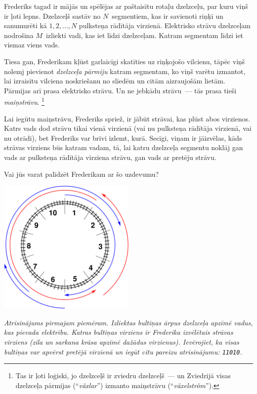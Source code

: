 \ifx\boi\undefined\fi
\def\version{jury-1}
Frederiks tagad ir mājās un spēlējas ar paštaisītu rotaļu dzelzceļu, par kuru viņš ir ļoti lepns.
Dzelzceļš sastāv no $N$~segmentiem, kas ir savienoti riņķī un sanumurēti kā $1, 2, \dots, N$ pulksteņa rādītāja virzienā.
Elektrisko strāvu dzelzceļam nodrošina $M$~izliekti vadi, kas iet līdzi dzelzceļam.
Katram segmentam līdzi iet vismaz viens vads.

Tiesa gan, Frederikam kļūst garlaicīgi skatīties uz riņķojošo vilcienu, tāpēc viņš nolemj pievienot \emph{dzelzceļa pārmiju}
katram segmentam, ko viņš varētu izmantot, lai izraisītu vilciena noskriešanu no sliedēm un citām aizraujošām lietām.
Pārmijas arī prasa elektrisko strāvu. Un ne jebkādu strāvu~--- tās prasa tieši \emph{maiņstrāvu}.%
\footnote{Tas ir ļoti loģiski, jo dzelzceļš ir zviedru dzelzceļš~--- un Zviedrijā visas dzelzceļa pārmijas
(``\emph{växlar}'') izmanto maiņstrāvu (``\emph{växelström}'').}

Lai iegūtu maiņstrāvu, Frederiks spriež, ir jābūt strāvai, kas plūst abos
virzienos. Katrs vads dod strāvu tikai vienā virzienā (vai nu pulksteņa rādītāja virzienā,
vai nu otrādi), bet Frederiks var brīvi izlemt, kurā. Secīgi, viņam ir jāizvēlas,
kāds strāvas virziens būs katram vadam, tā, lai katru dzelzceļa segmentu noklāj gan vads ar pulksteņa
rādītāja virziena strāvu, gan vads ar pretēju strāvu.

Vai jūs varat palīdzēt Frederikam ar šo uzdevumu?

\vspace{2mm}
\begin{center}
\includegraphics[width=0.5\textwidth]{alternatingfig.pdf}
\end{center}
\vspace{1mm}
{\em Atrisinājums pirmajam piemēram. Izliektas bultiņas ārpus dzelzceļa apzīmē vadus, kas pievada elektrību. Katras bultiņas virziens ir Frederika izvēlētais strāvas virziens (zila un sarkana krāsa apzīmē dažādus virzienus). Ievērojiet, ka visas bultiņas var apvērst pretējā virzienā un iegūt citu pareizu atrisinājumu: \texttt{11010}.}

